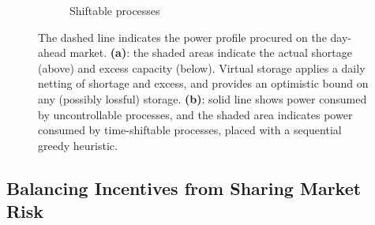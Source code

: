\documentclass[conference]{IEEEtran}
\begin{document}
\begin{figure}[t!]
\begin{subfigure}[b]{0.49\columnwidth}
        \caption{Shiftable processes}
        \label{fig:movable_d}
    \end{subfigure}
\caption{The dashed line indicates the power profile procured on the day-ahead market. \textbf{(a)}: the shaded areas indicate the actual shortage (above) and excess capacity (below). Virtual storage applies a daily netting of shortage and excess, and provides an optimistic bound on any (possibly lossful) storage. \textbf{(b)}: solid line shows power consumed by uncontrollable processes, and the shaded area indicates power consumed by time-shiftable processes, placed with a sequential greedy heuristic.}
\label{fig:shortage}
\end{figure}




\subsection{Balancing Incentives from Sharing Market Risk}
\end{document}
